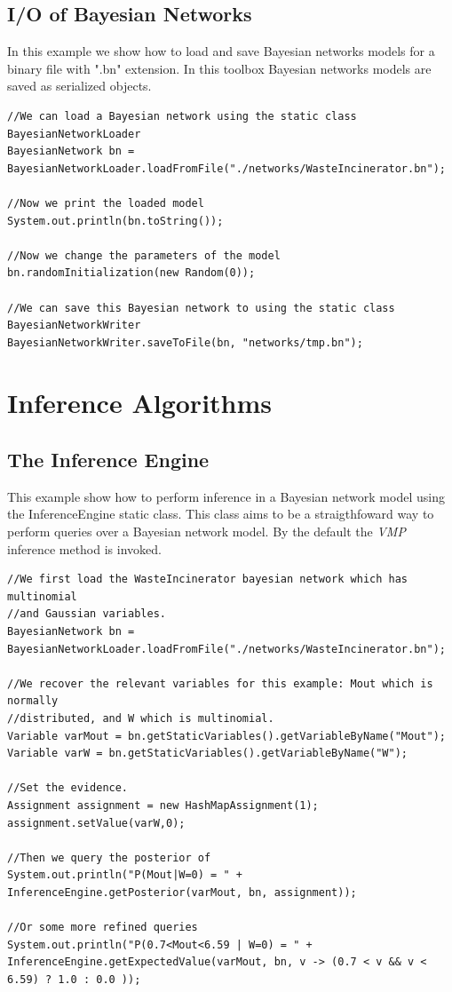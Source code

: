 \subsection{I/O of Bayesian Networks}

In this example we show how to load and save Bayesian networks models for a binary file with ".bn" extension. In this toolbox Bayesian networks models are saved as serialized objects.

\begin{lstlisting}
//We can load a Bayesian network using the static class BayesianNetworkLoader
BayesianNetwork bn = BayesianNetworkLoader.loadFromFile("./networks/WasteIncinerator.bn");

//Now we print the loaded model
System.out.println(bn.toString());

//Now we change the parameters of the model
bn.randomInitialization(new Random(0));

//We can save this Bayesian network to using the static class BayesianNetworkWriter
BayesianNetworkWriter.saveToFile(bn, "networks/tmp.bn");
\end{lstlisting}


\section{Inference Algorithms}

\subsection{The Inference Engine}
This example show how to perform inference in a Bayesian network model using the InferenceEngine static class. This class aims to be a straigthfoward way to perform queries over a Bayesian network model. By the default the \textit{VMP} inference method is invoked.

\begin{lstlisting}
//We first load the WasteIncinerator bayesian network which has multinomial 
//and Gaussian variables.
BayesianNetwork bn = BayesianNetworkLoader.loadFromFile("./networks/WasteIncinerator.bn");

//We recover the relevant variables for this example: Mout which is normally 
//distributed, and W which is multinomial.
Variable varMout = bn.getStaticVariables().getVariableByName("Mout");
Variable varW = bn.getStaticVariables().getVariableByName("W");

//Set the evidence.
Assignment assignment = new HashMapAssignment(1);
assignment.setValue(varW,0);

//Then we query the posterior of
System.out.println("P(Mout|W=0) = " + InferenceEngine.getPosterior(varMout, bn, assignment));

//Or some more refined queries
System.out.println("P(0.7<Mout<6.59 | W=0) = " + InferenceEngine.getExpectedValue(varMout, bn, v -> (0.7 < v && v < 6.59) ? 1.0 : 0.0 ));
\end{lstlisting}

